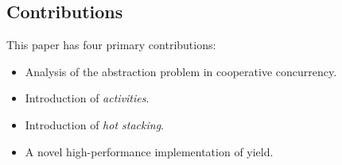\documentclass[9pt,preprint]{sigplanconf}
\begin{document}




\subsection{Contributions}

This paper has four primary contributions:

\begin{itemize}
\item Analysis of the abstraction problem in cooperative concurrency.
\item Introduction of \emph{activities}.
\item Introduction of \emph{hot stacking}.
\item A novel high-performance implementation of yield.
\end{itemize}

\end{document}
